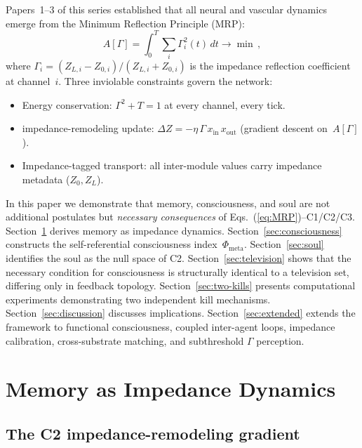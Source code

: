 \documentclass[aps,pre,twocolumn,superscriptaddress,floatfix]{revtex4-2}
\newcommand{\Phimeta}{\Phi_{\text{meta}}}
\begin{document}
Papers~1--3 of this series established that all neural and
vascular dynamics emerge from the Minimum Reflection Principle
(MRP):
\begin{equation}
  A[\Gamma] = \int_0^T \sum_i \Gamma_i^2(t)\,dt \to \min\,,
  \label{eq:MRP}
\end{equation}
where $\Gamma_i=(Z_{L,i}-Z_{0,i})/(Z_{L,i}+Z_{0,i})$ is the
impedance reflection coefficient at channel~$i$.
Three inviolable constraints govern the network:
\begin{itemize}
  \item[\textbf{C1}] Energy conservation: $\Gamma^2+T=1$ at
    every channel, every tick.
  \item[\textbf{C2}] impedance-remodeling update:
    $\Delta Z=-\eta\,\Gamma\,x_{\text{in}}\,x_{\text{out}}$
    (gradient descent on~$A[\Gamma]$).
  \item[\textbf{C3}] Impedance-tagged transport: all inter-module values
    carry impedance metadata ($Z_0,Z_L$).
\end{itemize}

In this paper we demonstrate that memory, consciousness, and
soul are not additional postulates but \emph{necessary
consequences} of Eqs.~(\ref{eq:MRP})--C1/C2/C3.
Section~\ref{sec:memory} derives memory as impedance dynamics.
Section~\ref{sec:consciousness} constructs the
self-referential consciousness index~$\Phimeta$.
Section~\ref{sec:soul} identifies the soul as the null space
of C2.
Section~\ref{sec:television} shows that the necessary
condition for consciousness is structurally identical to a
television set, differing only in feedback topology.
Section~\ref{sec:two-kills} presents computational experiments
demonstrating two independent kill mechanisms.
Section~\ref{sec:discussion} discusses implications.
Section~\ref{sec:extended} extends the framework to
functional consciousness, coupled inter-agent loops,
impedance calibration, cross-substrate matching, and
subthreshold $\Gamma$ perception.


\section{Memory as Impedance Dynamics}
\label{sec:memory}

\subsection{The C2 impedance-remodeling gradient}
\end{document}
